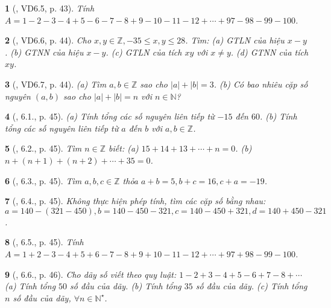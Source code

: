 \documentclass{article}
\newtheorem{baitoan}{}
\begin{document}
\begin{baitoan}[\cite{TLCT_THCS_Toan_6_so_hoc}, VD6.5, p. 43]
	Tính $A = 1 - 2 - 3 - 4 + 5 - 6 - 7 - 8 + 9 - 10 - 11 - 12 + \cdots + 97 - 98 - 99 - 100$.
\end{baitoan}

\begin{baitoan}[\cite{TLCT_THCS_Toan_6_so_hoc}, VD6.6, p. 44]
	Cho $x,y\in\mathbb{Z},-35\le x,y\le28$. Tìm: (a) {\rm GTLN} của hiệu $x - y$. (b) {\rm GTNN} của hiệu $x - y$. (c) {\rm GTLN} của tích $xy$ với $x\ne y$. (d) {\rm GTNN} của tích $xy$.
\end{baitoan}

\begin{baitoan}[\cite{TLCT_THCS_Toan_6_so_hoc}, VD6.7, p. 44]
	(a) Tìm $a,b\in\mathbb{Z}$ sao cho $|a| + |b| = 3$. (b) Có bao nhiêu cặp số nguyên $(a,b)$ sao cho $|a| + |b| = n$ với $n\in\mathbb{N}$?
\end{baitoan}

\begin{baitoan}[\cite{TLCT_THCS_Toan_6_so_hoc}, 6.1., p. 45]
	(a) Tính tổng các số nguyên liên tiếp từ $-15$ đến $60$. (b) Tính tổng các số nguyên liên tiếp từ $a$ đến $b$ với $a,b\in\mathbb{Z}$.
\end{baitoan}

\begin{baitoan}[\cite{TLCT_THCS_Toan_6_so_hoc}, 6.2., p. 45]
	Tìm $n\in\mathbb{Z}$ biết: (a) $15 + 14 + 13 + \cdots + n = 0$. (b) $n + (n + 1) + (n + 2) + \cdots + 35 = 0$.
\end{baitoan}

\begin{baitoan}[\cite{TLCT_THCS_Toan_6_so_hoc}, 6.3., p. 45]
	Tìm $a,b,c\in\mathbb{Z}$ thỏa $a + b = 5,b + c = 16,c + a = -19$.
\end{baitoan}

\begin{baitoan}[\cite{TLCT_THCS_Toan_6_so_hoc}, 6.4., p. 45]
	Không thực hiện phép tính, tìm các cặp số bằng nhau: $a = 140 - (321 - 450),b = 140 - 450 - 321,c = 140 - 450 + 321,d = 140 + 450 - 321$.
\end{baitoan}

\begin{baitoan}[\cite{TLCT_THCS_Toan_6_so_hoc}, 6.5., p. 45]
	Tính $A = 1 + 2 - 3 - 4 + 5 + 6 - 7 - 8 + 9 + 10 - 11 - 12 + \cdots + 97 + 98 - 99 - 100$.
\end{baitoan}

\begin{baitoan}[\cite{TLCT_THCS_Toan_6_so_hoc}, 6.6., p. 46]
	Cho dãy số viết theo quy luật: $1 - 2 + 3 - 4 + 5 - 6 + 7 - 8 + \cdots$ (a) Tính tổng $50$ số đầu của dãy. (b) Tính tổng $35$ số đầu của dãy. (c) Tính tổng $n$ số đầu của dãy, $\forall n\in\mathbb{N}^\star$.
\end{baitoan}
\end{document}
